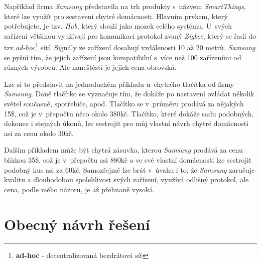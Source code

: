 Například firma \emph{Samsung} představila na trh produkty s~názvem \emph{SmartThings}, které lze využít pro sestavení chytré domácnosti.
Hlavním prvkem, který potřebujete, je tzv. \emph{Hub}, který slouží jako mozek celého systému.
U~svých zařízení většinou využívají pro komunikaci protokol zvaný \emph{Zigbee}, který se řadí do tzv.\emph{ad-hoc}\footnote{\textbf{ad-hoc} - decentralizovaná bezdrátová síť} sítí.
Signály ze zařízení dosahují vzdálenosti 10 až 20 metrů.
\emph{Samsung} se pyšní tím, že jejich zařízení jsou kompatibilní s~více než 100 zařízeními od různých výrobců.
Ale naneštěstí je jejich cena obrovská.

Lze si to představit na jednoduchém příkladu u~chytrého tlačítka od firmy \emph{Samsung}.
Dané tlačítko se vyznačuje tím, že dokáže po nastavení ovládat několik světel současně, spotřebiče, apod.
Tlačítko se v~průměru prodává za nějakých 15̈́\$, což je v~přepočtu něco okolo 380kč.
Tlačítko, které dokáže sadu podobných, dokonce i stejných úkonů, lze sestrojit pro můj vlastní návrh chytré domácnosti asi za cenu okolo 30kč.

Dalším příkladem může být chytrá zásuvka, kterou \emph{Samsung} prodává za cenu blízkou 35\$, což je v~přepočtu asi 880kč a ve své vlastní domácnosti lze sestrojit podobný kus asi za 60kč.
Samozřejmě lze brát v~úvahu i to, že \emph{Samsung} zaručuje kvalitu a dlouhodobou spolehlivost svých zařízení, využívá odlišný protokol, ale cena, podle mého názoru, je až přehnaně vysoká.

\newpage

\section*{Obecný návrh řešení}
\label{navrh:reseni}

